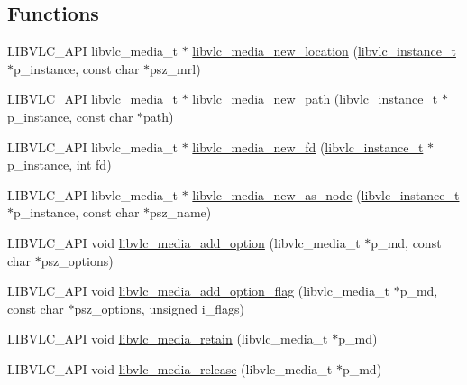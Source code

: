 \subsection*{Functions}
\begin{DoxyCompactItemize}
\item 
L\+I\+B\+V\+L\+C\+\_\+\+A\+PI libvlc\+\_\+media\+\_\+t $\ast$ \hyperlink{group__libvlc__media_gae1d3baee3f4610c6fe5818defcad3e6f}{libvlc\+\_\+media\+\_\+new\+\_\+location} (\hyperlink{group__libvlc__core_ga316d739a80da4678206c79f4d6c2e284}{libvlc\+\_\+instance\+\_\+t} $\ast$p\+\_\+instance, const char $\ast$psz\+\_\+mrl)
\item 
L\+I\+B\+V\+L\+C\+\_\+\+A\+PI libvlc\+\_\+media\+\_\+t $\ast$ \hyperlink{group__libvlc__media_ga051342375370f3bf3821a537d4413435}{libvlc\+\_\+media\+\_\+new\+\_\+path} (\hyperlink{group__libvlc__core_ga316d739a80da4678206c79f4d6c2e284}{libvlc\+\_\+instance\+\_\+t} $\ast$p\+\_\+instance, const char $\ast$path)
\item 
L\+I\+B\+V\+L\+C\+\_\+\+A\+PI libvlc\+\_\+media\+\_\+t $\ast$ \hyperlink{group__libvlc__media_ga192451a6b5fef7be482313876a4c3054}{libvlc\+\_\+media\+\_\+new\+\_\+fd} (\hyperlink{group__libvlc__core_ga316d739a80da4678206c79f4d6c2e284}{libvlc\+\_\+instance\+\_\+t} $\ast$p\+\_\+instance, int fd)
\item 
L\+I\+B\+V\+L\+C\+\_\+\+A\+PI libvlc\+\_\+media\+\_\+t $\ast$ \hyperlink{group__libvlc__media_ga1ccfa7815260b22adf96cc538a45fe77}{libvlc\+\_\+media\+\_\+new\+\_\+as\+\_\+node} (\hyperlink{group__libvlc__core_ga316d739a80da4678206c79f4d6c2e284}{libvlc\+\_\+instance\+\_\+t} $\ast$p\+\_\+instance, const char $\ast$psz\+\_\+name)
\item 
L\+I\+B\+V\+L\+C\+\_\+\+A\+PI void \hyperlink{group__libvlc__media_ga39511e64baa7c1fdbf89eddc88bf9e15}{libvlc\+\_\+media\+\_\+add\+\_\+option} (libvlc\+\_\+media\+\_\+t $\ast$p\+\_\+md, const char $\ast$psz\+\_\+options)
\item 
L\+I\+B\+V\+L\+C\+\_\+\+A\+PI void \hyperlink{group__libvlc__media_ga96d5e0f418eecf74149057796160fd3a}{libvlc\+\_\+media\+\_\+add\+\_\+option\+\_\+flag} (libvlc\+\_\+media\+\_\+t $\ast$p\+\_\+md, const char $\ast$psz\+\_\+options, unsigned i\+\_\+flags)
\item 
L\+I\+B\+V\+L\+C\+\_\+\+A\+PI void \hyperlink{group__libvlc__media_gaf4be74c918bc34ea4182e8028ea5f0ba}{libvlc\+\_\+media\+\_\+retain} (libvlc\+\_\+media\+\_\+t $\ast$p\+\_\+md)
\item 
L\+I\+B\+V\+L\+C\+\_\+\+A\+PI void \hyperlink{group__libvlc__media_gaffccede262624a361e20c3e887fa9b42}{libvlc\+\_\+media\+\_\+release} (libvlc\+\_\+media\+\_\+t $\ast$p\+\_\+md)

\end{DoxyCompactItemize}
